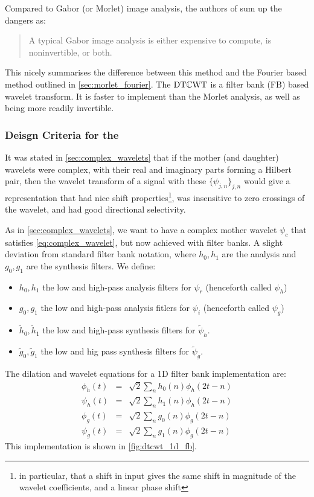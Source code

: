   Compared to Gabor (or Morlet) image analysis, the authors of
  \cite{selesnick_dual-tree_2005} sum up the dangers as:
  \begin{quote}
    A typical Gabor image analysis is either expensive to compute, is
    noninvertible, or both.
  \end{quote}
  This nicely summarises the difference between this method and the Fourier
  based method outlined in \autoref{sec:morlet_fourier}. The $\mathrm{DT}\mathbb{C}\mathrm{WT}$ is
  a filter bank (FB) based wavelet transform. It is faster
  to implement than the Morlet analysis, as well as being more readily invertible.

\subsubsection{Deisgn Criteria for the \DTCWT}
  It was stated in
  \autoref{sec:complex_wavelets} that if the mother (and daughter) wavelets
  were complex, with their real and imaginary parts forming a Hilbert pair,
  then the wavelet transform of a signal with these $\{\psi_{j,n}\}_{j,n}$
  would give a representation that had nice shift properties\footnote{in
  particular, that a shift in input gives the same shift in magnitude of the
  wavelet coefficients, and a linear phase shift}, was insensitive to zero crossings of the
  wavelet, and had good directional selectivity. 
  
  As in \autoref{sec:complex_wavelets}, we want to have a complex mother
  wavelet $\psi_c$ that satisfies \autoref{eq:complex_wavelet}, but now
  achieved with filter banks. A slight deviation from standard filter bank
  notation, where $h_0, h_1$ are the analysis and $g_0,g_1$ are the synthesis
  filters. We define:
  \begin{itemize}
    \item $h_0, h_1$ the low and high-pass analysis filters for $\psi_r$ (henceforth called
      $\psi_h$)
    \item $g_0, g_1$ the low and high-pass analysis fitlers for $\psi_i$
      (henceforth called $\psi_g$)
    \item $\tilde{h}_0, \tilde{h}_1$ the low and high-pass synthesis filters
      for $\tilde{\psi}_h$.
    \item $\tilde{g}_0, \tilde{g}_1$ the low and hig pass synthesis filters for
      $\tilde{\psi}_g$.
  \end{itemize}

  The dilation and wavelet equations for a 1D filter bank implementation are:
  \begin{eqnarray}
    \phi_h(t) & = & \sqrt{2} \sum_n h_0(n) \phi_h(2t-n) \\
    \psi_h(t) & = & \sqrt{2} \sum_n h_1(n) \phi_h(2t-n) \\
    \phi_g(t) & = & \sqrt{2} \sum_n g_0(n) \phi_g(2t-n) \\
    \psi_g(t) & = & \sqrt{2} \sum_n g_1(n) \phi_g(2t-n) 
  \end{eqnarray}
  This implementation is shown in \autoref{fig:dtcwt_1d_fb}.

